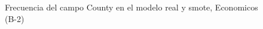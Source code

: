 \begin{figure}[H]
    \centering
    
    \caption{Frecuencia del campo County en el modelo real y smote, Economicos (B-2)}
    \label{frecuency-County-smote-enc}
\end{figure}